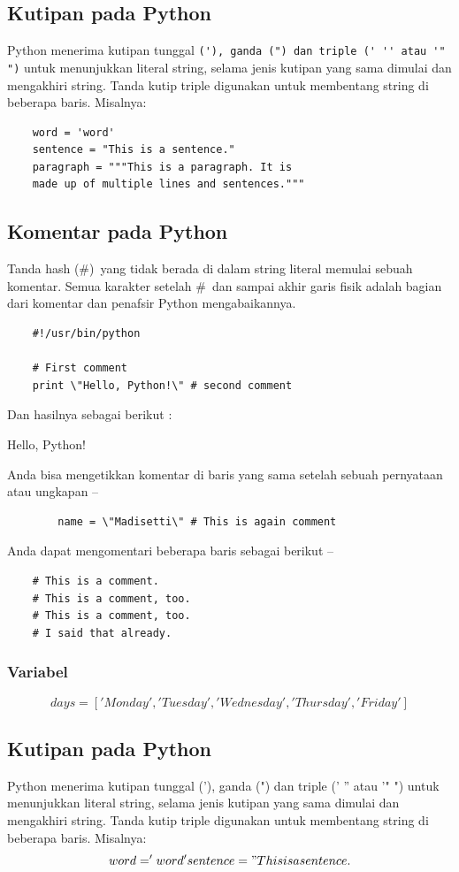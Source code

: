 \subsection{Kutipan pada Python}
Python menerima kutipan tunggal \verb|('), ganda (") dan triple (' '' atau '" ")| untuk menunjukkan literal string, selama jenis kutipan yang sama dimulai dan mengakhiri string.
Tanda kutip triple digunakan untuk membentang string di beberapa baris. Misalnya:
	\begin{verbatim}
	word = 'word'
	sentence = "This is a sentence."
	paragraph = """This is a paragraph. It is
	made up of multiple lines and sentences."""
	\end {verbatim}

\subsection{Komentar pada Python}
Tanda hash (\#)\ yang tidak berada di dalam string literal memulai sebuah komentar. Semua karakter setelah \#\ dan sampai akhir garis fisik adalah bagian dari komentar dan penafsir Python mengabaikannya.
	\begin{verbatim}
	#!/usr/bin/python

	# First comment
	print \"Hello, Python!\" # second comment
	\end{verbatim}

	 Dan hasilnya sebagai berikut :
	
	    Hello, Python!


Anda bisa mengetikkan komentar di baris yang sama setelah sebuah pernyataan atau ungkapan –
	\begin{verbatim}
	    name = \"Madisetti\" # This is again comment
	\end{verbatim}

Anda dapat mengomentari beberapa baris sebagai berikut –
	\begin{verbatim}
	# This is a comment.
	# This is a comment, too.
	# This is a comment, too.
	# I said that already.
	\end{verbatim}

\subsubsection{Variabel}	
	\begin{equation}
	days = ['Monday', 'Tuesday', 'Wednesday',
		'Thursday', 'Friday']
	\end{equation}
	
\subsection{Kutipan pada Python}
Python menerima kutipan tunggal ('), ganda (") dan triple (' '' atau '" ") untuk menunjukkan literal string, selama jenis kutipan yang sama dimulai dan mengakhiri string.
Tanda kutip triple digunakan untuk membentang string di beberapa baris. Misalnya:
	\begin{equation}
	word = 'word'
	sentence = "This is a sentence.
	\end{equation}


